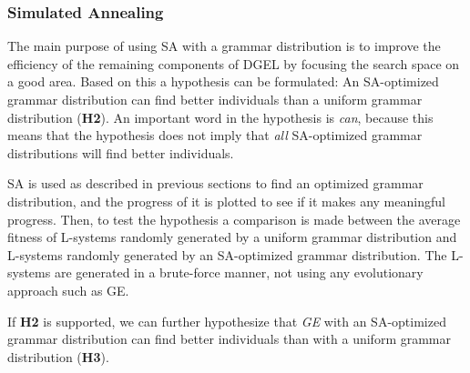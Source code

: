 \subsubsection{Simulated Annealing}
The main purpose of using SA with a grammar distribution is to improve the efficiency of the remaining components of DGEL by focusing the search space on a good area.
Based on this a hypothesis can be formulated: An SA-optimized grammar distribution can find better individuals than a uniform grammar distribution (\textbf{H2}).
An important word in the hypothesis is \textit{can}, because this means that the hypothesis does not imply that \textit{all} SA-optimized grammar distributions will find better individuals.

SA is used as described in previous sections to find an optimized grammar distribution, and the progress of it is plotted to see if it makes any meaningful progress.
Then, to test the hypothesis a comparison is made between the average fitness of L-systems randomly generated by a uniform grammar distribution and L-systems randomly generated by an SA-optimized grammar distribution.
The L-systems are generated in a brute-force manner, not using any evolutionary approach such as GE.

If \textbf{H2} is supported, we can further hypothesize that \textit{GE} with an SA-optimized grammar distribution can find better individuals than with a uniform grammar distribution (\textbf{H3}).



